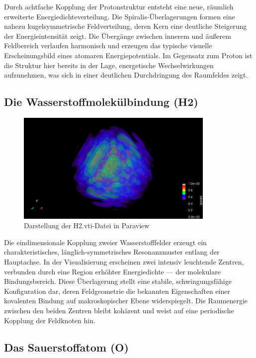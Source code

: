 Durch achtfache Kopplung der Protonstruktur entsteht eine neue, räumlich erweiterte Energiedichteverteilung. 
Die Spiralis-Überlagerungen formen eine nahezu kugelsymmetrische Feldverteilung, deren Kern eine deutliche Steigerung der Energieintensität zeigt. 
Die Übergänge zwischen innerem und äußerem Feldbereich verlaufen harmonisch und erzeugen das typische visuelle Erscheinungsbild eines atomaren Energiepotentials.
Im Gegensatz zum Proton ist die Struktur hier bereits in der Lage, energetische Wechselwirkungen aufzunehmen, was sich in einer deutlichen Durchdringung des Raumfeldes zeigt.

\newpage

\subsection{Die Wasserstoffmolekülbindung (H2)}

\begin{figure}
  \centering
  \includegraphics[width=0.85\textwidth]{Grafiken/05_Visualisierung/H2/H2_Volume_XYZ_Cam.jpeg}
  \caption{Darstellung der H2.vti-Datei in Paraview}
  \label{fig:H2}
\end{figure}

Die eindimensionale Kopplung zweier Wasserstofffelder erzeugt ein charakteristisches, länglich-symmetrisches Resonanzmuster entlang der Hauptachse. 
In der Visualisierung erscheinen zwei intensiv leuchtende Zentren, verbunden durch eine Region erhöhter Energiedichte — der molekulare Bindungsbereich. 
Diese Überlagerung stellt eine stabile, schwingungsfähige Konfiguration dar, deren Feldgeometrie die bekannten Eigenschaften einer kovalenten Bindung auf makroskopischer Ebene widerspiegelt. 
Die Raumenergie zwischen den beiden Zentren bleibt kohärent und weist auf eine periodische Kopplung der Feldknoten hin.

\newpage

\subsection{Das Sauerstoffatom (O)}

